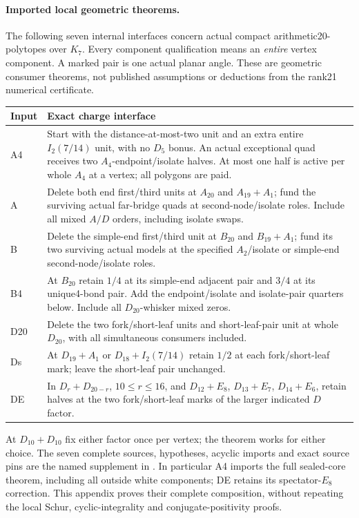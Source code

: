 \paragraph{Imported local geometric theorems.}
The following seven internal interfaces concern actual compact
arithmetic20-polytopes over $K_7$. Every component qualification means
an \emph{entire} vertex component. A marked pair is one actual planar
angle. These are geometric consumer theorems, not published assumptions
or deductions from the rank21 numerical certificate.
\begin{center}\small
\begin{tabular}{p{.09\linewidth}p{.83\linewidth}}\toprule
Input&Exact charge interface\\\midrule
A4&Start with the distance-at-most-two unit and an extra entire
$I_2(7/14)$ unit, with no $D_5$ bonus. An actual exceptional quad
receives two $A_4$-endpoint/isolate halves. At most one half is active
per whole $A_4$ at a vertex; all polygons are paid.\\
A&Delete both end first/third units at $A_{20}$ and $A_{19}+A_1$;
fund the surviving actual far-bridge quads at second-node/isolate
roles. Include all mixed $A/D$ orders, including isolate swaps.\\
B&Delete the simple-end first/third unit at $B_{20}$ and $B_{19}+A_1$;
fund its two surviving actual models at the specified $A_2$/isolate
or simple-end second-node/isolate roles.\\
B4&At $B_{20}$ retain $1/4$ at its simple-end adjacent pair and
$3/4$ at its unique4-bond pair. Add the endpoint/isolate and
isolate-pair quarters below. Include all $D_{20}$-whisker mixed zeros.\\
D20&Delete the two fork/short-leaf units and short-leaf-pair unit
at whole $D_{20}$, with all simultaneous consumers included.\\
Ds&At $D_{19}+A_1$ or $D_{18}+I_2(7/14)$ retain $1/2$ at each
fork/short-leaf mark; leave the short-leaf pair unchanged.\\
DE&In $D_r+D_{20-r}$, $10\le r\le16$, and $D_{12}+E_8$,
$D_{13}+E_7$, $D_{14}+E_6$, retain halves at the two fork/short-leaf
marks of the larger indicated $D$ factor.\\\bottomrule
\end{tabular}
\end{center}
At $D_{10}+D_{10}$ fix either factor once per vertex; the theorem
works for either choice. The seven complete sources, hypotheses,
acyclic imports and exact source pins are the named supplement in
.
In particular A4 imports the full sealed-core theorem, including all
outside white components; DE retains its spectator-$E_8$ correction.
This appendix proves their complete composition, without repeating
the local Schur, cyclic-integrality and conjugate-positivity proofs.


